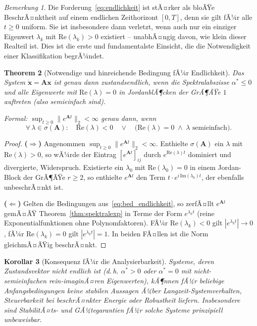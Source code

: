 ﻿\documentclass[12pt, a4paper, titlepage]{report}
\newtheorem{theorem}{Theorem}[section]
\newtheorem{corollary}[theorem]{Korollar}
\theoremstyle{definition}
\theoremstyle{remark}
\newtheorem{remark}[theorem]{Bemerkung}
\newcommand{\vx}{\bm{x}}
\newcommand{\vA}{\bm{A}}
\newcommand{\spec}{\sigma}
\newcommand{\re}{\mathrm{Re}}
\newcommand{\im}{\mathrm{Im}}
\begin{document}
\begin{remark}
Die Forderung~\eqref{eq:endlichkeit} ist stÃ¤rker als bloÃŸe BeschrÃ¤nktheit auf einem
endlichen Zeithorizont $[0, T]$, denn sie gilt fÃ¼r alle $t \geq 0$ uniform. Sie ist
insbesondere dann verletzt, wenn auch nur ein einziger Eigenwert $\lambda_k$ mit
$\re(\lambda_k) > 0$ existiert -- unabhÃ¤ngig davon, wie klein dieser Realteil ist.
Dies ist die erste und fundamentalste Einsicht, die die Notwendigkeit einer
Klassifikation begrÃ¼ndet.
\end{remark}

\begin{theorem}[Notwendige und hinreichende Bedingung fÃ¼r Endlichkeit]
\label{thm:endlichkeit}
Das System $\dot{\vx} = \vA\vx$ ist genau dann zustandsendlich, wenn die
Spektralabszisse $\alpha^* \leq 0$ und alle Eigenwerte mit $\re(\lambda) = 0$ in
JordanblÃ¶cken der GrÃ¶ÃŸe $1$ auftreten (also semieinfach sind).

Formal: $\sup_{t \geq 0}\|e^{\vA t}\|_2 < \infty$ genau dann, wenn
\begin{equation}
  \forall\,\lambda \in \spec(\vA):\quad
  \re(\lambda) < 0 \quad\vee\quad
  \bigl(\re(\lambda) = 0 \;\wedge\; \text{$\lambda$ semieinfach}\bigr).
  \label{eq:bed_endlichkeit}
\end{equation}
\end{theorem}

\begin{proof}
\textbf{($\Rightarrow$)} Angenommen $\sup_{t\geq 0}\|e^{\vA t}\|_2 < \infty$.
Enthielte $\spec(\vA)$ ein $\lambda$ mit $\re(\lambda) > 0$, so wÃ¼rde der Eintrag
$[e^{\vA t}]_{ij}$ durch $e^{\re(\lambda)t}$ dominiert und divergierte, Widerspruch.
Existierte ein $\lambda_0$ mit $\re(\lambda_0) = 0$ in einem Jordan-Block der GrÃ¶ÃŸe
$r \geq 2$, so enthielte $e^{\vA t}$ den Term $t \cdot e^{i\,\im(\lambda_0)t}$, der
ebenfalls unbeschrÃ¤nkt ist.

\textbf{($\Leftarrow$)} Gelten die Bedingungen aus~\eqref{eq:bed_endlichkeit}, so
zerfÃ¤llt $e^{\vA t}$ gemÃ¤ÃŸ Theorem~\ref{thm:spektralexp} in Terme der Form
$e^{\lambda_k t}$ (reine Exponentialfunktionen ohne Polynomfaktoren). FÃ¼r
$\re(\lambda_k) < 0$ gilt $|e^{\lambda_k t}| \to 0$, fÃ¼r $\re(\lambda_k) = 0$ gilt
$|e^{\lambda_k t}| = 1$. In beiden FÃ¤llen ist die Norm gleichmÃ¤ÃŸig beschrÃ¤nkt. \qedhere
\end{proof}

\begin{corollary}[Konsequenz fÃ¼r die Analysierbarkeit]
\label{cor:analysierbarkeit}
Systeme, deren Zustandsvektor nicht endlich ist (d.\,h. $\alpha^* > 0$ oder
$\alpha^* = 0$ mit nicht-semieinfachen rein-imaginÃ¤ren Eigenwerten), kÃ¶nnen fÃ¼r
beliebige Anfangsbedingungen keine stabilen Aussagen Ã¼ber Langzeit-Systemverhalten,
Steuerbarkeit bei beschrÃ¤nkter Energie oder Robustheit liefern. Insbesondere sind
StabilitÃ¤ts- und GÃ¼tegarantien fÃ¼r solche Systeme prinzipiell unbeweisbar.
\end{corollary}
\end{document}
